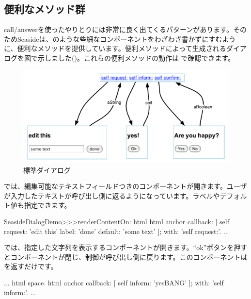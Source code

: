 \documentclass[a4paper,10pt,twoside]{book}
\begin{document}
\subsection{便利なメソッド群}

call/answerを使ったやりとりには非常に良く出てくるパターンがあります。そのためSeasideは、のような些細なコンポーネントをわざわざ書かずにすむように、便利なメソッドを提供しています。便利メソッドによって生成されるダイアログを図で示しました()。これらの便利メソッドの動作は で確認できます。

\begin{figure}[b]
\begin{center}
\includegraphics[width=\textwidth]{dialogs}
\caption{標準ダイアログ}
\end{center}
\end{figure}

では、編集可能なテキストフィールドつきのコンポーネントが開きます。ユーザが入力したテキストが呼び出し側に返るようになっています。ラベルやデフォルト値も指定できます。

\begin{code}{}
SeasideDialogDemo>>>renderContentOn: html
	html anchor
		callback: [ self request: 'edit this' label: 'done' default: 'some text' ];
		with: 'self request:'.
...
\end{code}

 では、指定した文字列を表示するコンポーネントが開きます。``ok''ボタンを押すとコンポーネントが閉じ、制御が呼び出し側に戻ります。このコンポーネントはを返すだけです。

\begin{code}{}
...
	html space.
	html anchor
		callback: [ self inform: 'yesBANG' ];
		with: 'self inform:'.
...
\end{code}
\end{document}
